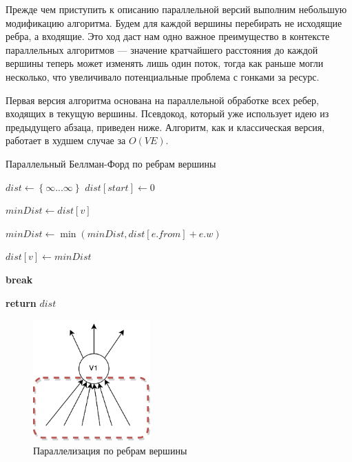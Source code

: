 Прежде чем приступить к описанию параллельной версий выполним небольшую модификацию алгоритма. Будем для каждой вершины перебирать не исходящие ребра, а входящие. Это ход даст нам одно важное преимущество в контексте параллельных алгоритмов --- значение кратчайшего расстояния до каждой вершины теперь может изменять лишь один поток, тогда как раньше могли несколько, что увеличивало потенциальные проблема с гонками за ресурс.

Первая версия алгоритма основана на параллельной обработке всех ребер, входящих в текущую вершины. Псевдокод, который уже использует идею из предыдущего абзаца, приведен ниже. Алгоритм, как и классическая версия, работает в худшем случае за $O(VE)$. 



\FloatBarrier
\begin{algorithm}
\caption{Параллельный Беллман-Форд по ребрам вершины}\label{bf_classic_par1}
\begin{algorithmic}[1]
\State $dist\gets \left\{ {\infty ... \infty}\right\}$
\State $dist[start] \gets 0$
 
		\algrenewcommand{}
		\State $minDist \gets dist[v]$

		  
			\State $minDist \gets \min(minDist, dist[e.from] + e.w)$
		\EndFor	
					
			\State $dist[v] \gets minDist$  

		\EndIf

		\algrenewcommand{}

	\EndFor
		\State \textbf{break}
	\EndIf

\EndFor
\State \textbf{return} $dist$
\EndProcedure
\end{algorithmic}
\end{algorithm}
\FloatBarrier

\begin{figure}[h]
\caption{Параллелизация по ребрам вершины}
\label{bf_par_1}
\centering
\includegraphics[width=0.4\textwidth]{img/bf_par_1.png}
\end{figure}

